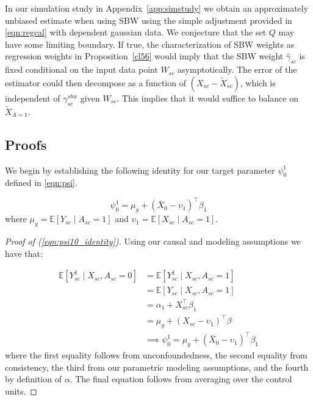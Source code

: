 \begin{remark}\label{remark:sbwspeculation}
    In our simulation study in Appendix~\ref{app:simstudy} we obtain an approximately unbiased estimate when using SBW using the simple adjustment provided in \eqref{eqn:regcal} with dependent gaussian data. We conjecture that the set $Q$ may have some limiting boundary. If true, the characterization of SBW weights as regression weights in Proposition~\ref{cl56} would imply that the SBW weight $\hat{\gamma}_{sc}$ is fixed conditional on the input data point $W_{sc}$ asymptotically. The error of the estimator could then decompose as a function of $(X_{sc} - \tilde{X}_{sc})$, which is independent of $\gamma_{sc}^{sbw}$ given $W_{sc}$. This implies that it would suffice to balance on $\tilde{X}_{A=1}$.
\end{remark}

\subsection{Proofs}\label{app:AsecIII}

We begin by establishing the following identity for our target parameter $\psi_0^1$ defined in \eqref{eqn:psi}.

\begin{equation}\label{eqn:psi10_identity}
\psi^1_0 = \mu_y + (\bar{X}_0 - \upsilon_1)^\top \beta_1
\end{equation}
%
where $\mu_y = \mathbb{E}[Y_{sc} \mid A_{sc} = 1]$ and $\upsilon_1 = \mathbb{E}[X_{sc} \mid A_{sc} = 1]$.

\begin{proof}[Proof of (\ref{eqn:psi10_identity})]
Using our causal and modeling assumptions we have that:

\begin{align*}
\mathbb{E}[Y_{sc}^1 \mid X_{sc}, A_{sc} = 0] &= \mathbb{E}[Y_{sc}^1 \mid X_{sc}, A_{sc} = 1] \\
&= \mathbb{E}[Y_{sc} \mid X_{sc}, A_{sc} = 1] \\
&= \alpha_1 + X_{sc}^\top \beta_1 \\
&= \mu_y + (X_{sc} - \upsilon_1)^\top \beta \\
&\implies \psi_0^1 = \mu_y + (\bar{X}_0 - \upsilon_1)^\top \beta_1
\end{align*}
%
where the first equality follows from unconfoundedness, the second equality from consistency, the third from our parametric modeling assumptions, and the fourth by definition of $\alpha$. The final equation follows from averaging over the control units.
\end{proof}
%

